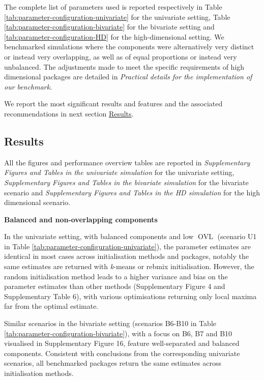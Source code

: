 The complete list of parameters used is reported respectively in Table \ref{tab:parameter-configuration-univariate} for the univariate setting, Table \ref{tab:parameter-configuration-bivariate} for the bivariate setting and \ref{tab:parameter-configuration-HD} for the high-dimensional setting. We benchmarked simulations where the components were alternatively very distinct or instead very overlapping, as well as of equal proportions or instead very unbalanced. The adjustments made to meet the specific requirements of high dimensional packages are detailed in \emph{Practical details for the implementation of our benchmark}.

We report the most significant results and features and the associated recommendations in next section \protect\hyperlink{results}{Results}.

\hypertarget{results}{%
\subsection{Results}\label{results}}

All the figures and performance overview tables are reported in \emph{Supplementary Figures and Tables in the univariate simulation} for the univariate setting, \emph{Supplementary Figures and Tables in the bivariate simulation} for the bivariate scenario and \emph{Supplementary Figures and Tables in the HD simulation} for the high dimensional scenario.

\textbf{Balanced and non-overlapping components}

In the univariate setting, with balanced components and low \(\operatorname{OVL}\) (scenario U1 in Table
\ref{tab:parameter-configuration-univariate}), the parameter
estimates are identical in most cases across initialisation methods and packages, notably the same estimates are returned with \emph{k}-means or rebmix initialisation. However, the random initialisation method leads
to a higher variance and bias on the parameter estimates than other
methods (Supplementary Figure 4 and Supplementary Table 6),
with various optimisations returning only local maxima far from the
optimal estimate.

Similar scenarios in the bivariate setting (scenarios B6-B10 in Table \ref{tab:parameter-configuration-bivariate}), with a focus on B6, B7 and B10 visualised in Supplementary Figure 16, feature well-separated and balanced components. Consistent with conclusions from the corresponding univariate scenarios, all benchmarked packages return the same estimates across initialisation methods.

